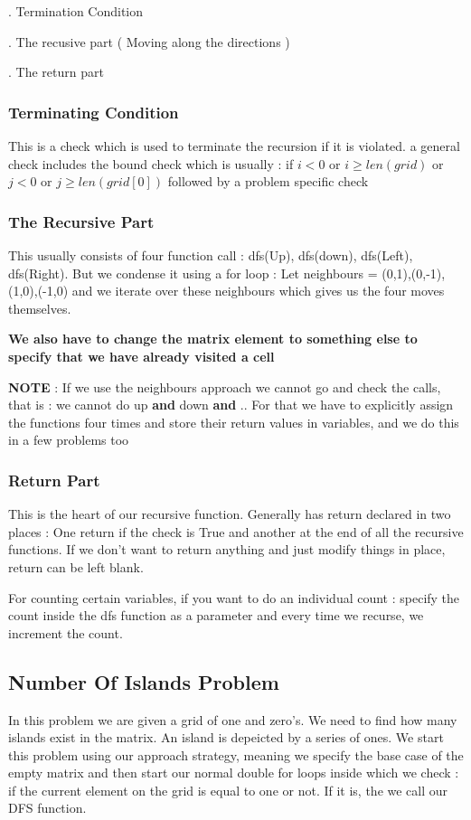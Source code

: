 \documentclass{article}
\newcommand{\nd}{\noindent}
\begin{document}
\nd 1. Termination Condition 

\nd 2. The recusive part ( Moving along the directions ) 

\nd 3. The return part 

\subsubsection{Terminating Condition }
This is a check which is used to terminate the recursion if it is violated. a general check includes the bound check which is usually : if $i<0$ or $i \geq len(grid)$ or $ j<0$ or $ j \geq len(grid[0])$  followed by a problem specific check 

\subsubsection{The Recursive Part } 
This usually consists of four function call : dfs(Up), dfs(down), dfs(Left), dfs(Right). But we condense it using a for loop : 
Let neighbours = (0,1),(0,-1),(1,0),(-1,0) and we iterate over these neighbours which gives us the four moves themselves. 

\nd \textbf{We also have to change the matrix element to something else to specify that we have already visited a cell}

\nd \textbf{NOTE} : If we use the neighbours approach we cannot go and check the calls, that is : we cannot do up \textbf{and} down \textbf{and} .. For that we have to explicitly assign the functions four times and store their return values in variables, and we do this in a few problems too 

\subsubsection{Return Part } 
This is the heart of our recursive function. Generally has return declared in two places : One return if the check is True and another at the end of all the recursive functions. If we don't want to return anything and just modify things in place, return can be left blank. 

\nd For counting certain variables, if you want to do an individual count : specify the count inside the dfs function as a parameter and every time we recurse, we increment the count. 

\subsection{Number Of Islands Problem} 
In this problem we are given a grid of one and zero's. We need to find how many islands exist in the matrix. An island is depeicted by a series of ones. We start this problem using our approach strategy, meaning we specify the base case of the empty matrix and then start our normal double for loops inside which we check : if the current element on the grid is equal to one or not. If it is, the we call our DFS function. 
\end{document}
